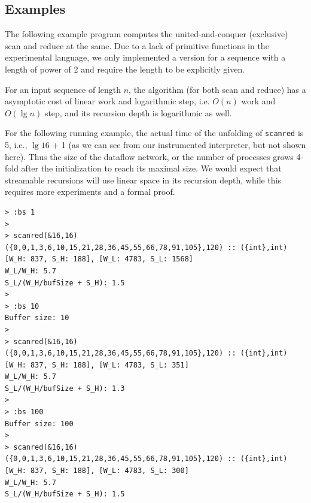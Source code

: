 %
%
%


\subsection{Examples}

The following example program computes the united-and-conquer (exclusive) scan and reduce at the same. 
Due to a lack of primitive functions in the experimental language, we only implemented a version for a sequence with a length of power of 2 and require the length to be explicitly given. 

For an input sequence of length $n$, the algorithm (for both scan and reduce) has a asymptotic cost of linear work and logarithmic step, i.e. $O(n)$ work and $O(\lg{n})$ step, and its recursion depth is logarithmic as well. \\


\vspace{0.5cm}

For the following running example, the actual time of the unfolding of \texttt{scanred} is 5, i.e., $\lg 16$ + 1 (as we can see from our instrumented interpreter, but not shown here). Thus the size of the dataflow network, or the number of processes grows 4-fold after the initialization to reach its maximal size.
We would expect that streamable recursions will use linear space in its recursion depth, while this requires more experiments and a formal proof. \\

\begin{lstlisting}[style=nesl-style]
> :bs 1
>
> scanred(&16,16)
({0,0,1,3,6,10,15,21,28,36,45,55,66,78,91,105},120) :: ({int},int)
[W_H: 837, S_H: 188], [W_L: 4783, S_L: 1568]
W_L/W_H: 5.7
S_L/(W_H/bufSize + S_H): 1.5
>
> :bs 10
Buffer size: 10
>
> scanred(&16,16)
({0,0,1,3,6,10,15,21,28,36,45,55,66,78,91,105},120) :: ({int},int)
[W_H: 837, S_H: 188], [W_L: 4783, S_L: 351]
W_L/W_H: 5.7
S_L/(W_H/bufSize + S_H): 1.3
>
> :bs 100
Buffer size: 100
>
> scanred(&16,16)
({0,0,1,3,6,10,15,21,28,36,45,55,66,78,91,105},120) :: ({int},int)
[W_H: 837, S_H: 188], [W_L: 4783, S_L: 300]
W_L/W_H: 5.7
S_L/(W_H/bufSize + S_H): 1.5
\end{lstlisting}
